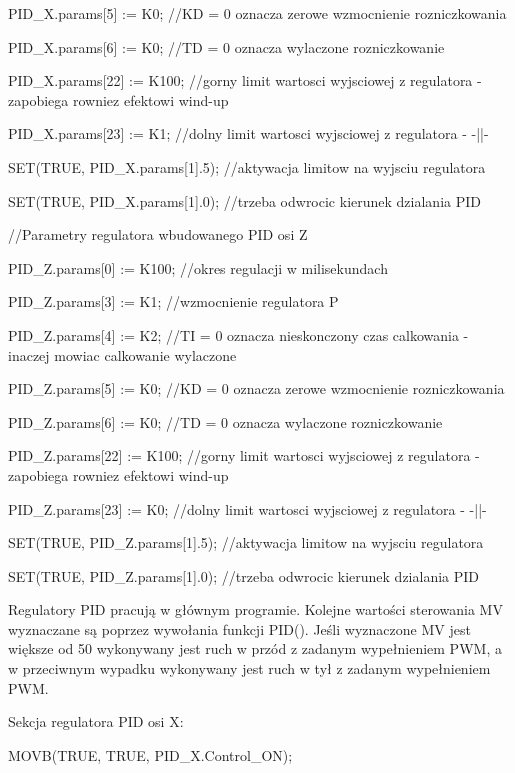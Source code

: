 \documentclass{mwrep}
\begin{document}
PID\_X.params[5] := K0; //KD = 0 oznacza zerowe wzmocnienie rozniczkowania

PID\_X.params[6] := K0; //TD = 0 oznacza wylaczone rozniczkowanie 

PID\_X.params[22] := K100; //gorny limit wartosci wyjsciowej z regulatora - zapobiega rowniez efektowi wind-up

PID\_X.params[23] := K1; //dolny limit wartosci wyjsciowej z regulatora - -||-

SET(TRUE, PID\_X.params[1].5); //aktywacja limitow na wyjsciu regulatora

SET(TRUE, PID\_X.params[1].0); //trzeba odwrocic kierunek dzialania PID 

\vspace{1cm}

//Parametry regulatora wbudowanego PID osi Z

PID\_Z.params[0] := K100; //okres regulacji w milisekundach

PID\_Z.params[3] := K1; //wzmocnienie regulatora P

PID\_Z.params[4] := K2; //TI = 0 oznacza nieskonczony czas calkowania - inaczej mowiac calkowanie wylaczone

PID\_Z.params[5] := K0; //KD = 0 oznacza zerowe wzmocnienie rozniczkowania

PID\_Z.params[6] := K0; //TD = 0 oznacza wylaczone rozniczkowanie 

PID\_Z.params[22] := K100; //gorny limit wartosci wyjsciowej z regulatora - zapobiega rowniez efektowi wind-up

PID\_Z.params[23] := K0; //dolny limit wartosci wyjsciowej z regulatora - -||-

SET(TRUE, PID\_Z.params[1].5); //aktywacja limitow na wyjsciu regulatora

SET(TRUE, PID\_Z.params[1].0); //trzeba odwrocic kierunek dzialania PID 


Regulatory PID pracują w głównym programie. Kolejne wartości sterowania MV wyznaczane są poprzez wywołania funkcji PID(). Jeśli wyznaczone MV jest większe od 50 wykonywany jest ruch w przód z zadanym wypełnieniem PWM, a w przeciwnym wypadku wykonywany jest ruch w tył z zadanym wypełnieniem PWM.

\vspace{1cm}

Sekcja regulatora PID osi X:

\vspace{0.3cm}

\quad MOVB(TRUE, TRUE, PID\_X.Control\_ON);
\end{document}

